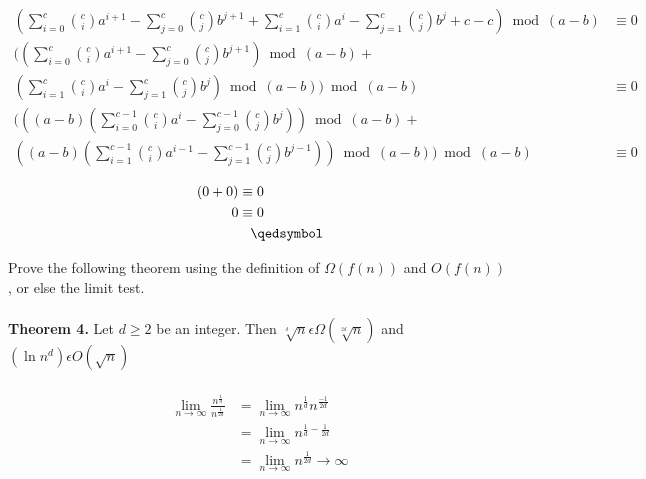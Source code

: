 \documentclass[12pt]{article}
\begin{document}
\begin{enumerate}
\begin{align*}
(\sum\limits_{i = 0}^{c} {c \choose i} a^{i+1} - \sum\limits_{j = 0}^{c} {c \choose j} b^{j+1} + \sum\limits_{i = 1}^{c} {c \choose i} a^i - \sum\limits_{j = 1}^{c} {c \choose j} b^j + c - c)\bmod{(a-b)} &\equiv 0\\
((\sum\limits_{i = 0}^{c} {c \choose i} a^{i+1} - \sum\limits_{j = 0}^{c} {c \choose j} b^{j+1})\bmod{(a-b)} +\\ (\sum\limits_{i = 1}^{c} {c \choose i} a^i - \sum\limits_{j = 1}^{c} {c \choose j} b^j)\bmod{(a-b)})\bmod{(a-b)} &\equiv 0\\
(((a-b)(\sum\limits_{i = 0}^{c-1} {c \choose i} a^{i} - \sum\limits_{j = 0}^{c-1} {c \choose j} b^{j}))\bmod{(a-b)} +\\ ((a-b)(\sum\limits_{i = 1}^{c-1} {c \choose i} a^{i-1} - \sum\limits_{j = 1}^{c-1} {c \choose j} b^{j-1}))\bmod{(a-b)})\bmod{(a-b)} &\equiv 0\\
\end{align*}
\begin{align*}
(0 + 0) &\equiv 0\\
0 &\equiv 0 \\
&\hspace{0.3cm}\qedsymbol
\end{align*}
\end{enumerate}
Prove the following theorem using the definition of \begin{math} \Omega (f (n))\end{math} and \begin{math}O(f (n))\end{math} , or else the limit test.\\\\
\noindent \textbf{Theorem 4.} Let \begin{math}d \geq 2\end{math} be an integer. Then \begin{math}\sqrt[^d]{n} \epsilon \Omega (\sqrt[^{2d}]{n})\end{math} and \begin{math}(\ln {n}^d) \epsilon O(\sqrt{n})\end{math}\\\\
\begin{align}
\lim_{n\to\infty} \frac{n^{\frac{1}{d}}}{n^{\frac{1}{2d}}} &= \lim_{n\to\infty} n^{\frac{1}{d}} n^{\frac{-1}{2d}}\\
&= \lim_{n\to\infty} n^{\frac{1}{d}-\frac{1}{2d}}\\
&= \lim_{n\to\infty} n^{\frac{1}{2d}} \rightarrow \infty
\end{align}\\
\end{document}
